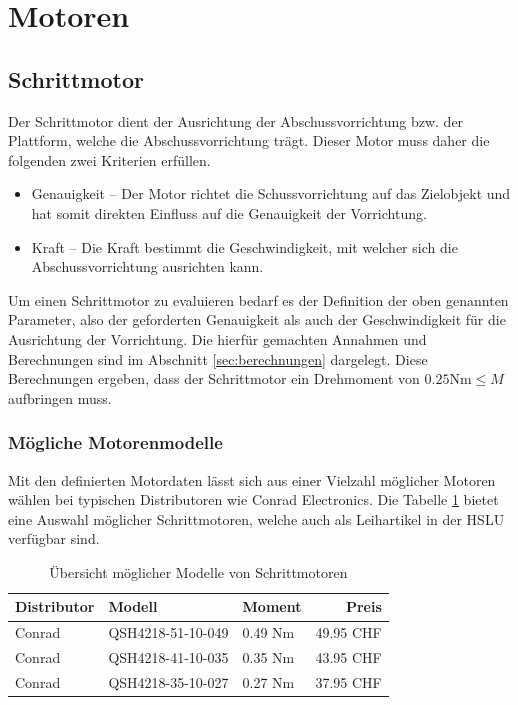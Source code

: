 \section{Motoren} \label{sec:motors}

\subsection{Schrittmotor}
Der Schrittmotor dient der Ausrichtung der Abschussvorrichtung bzw. der
Plattform, welche die Abschussvorrichtung trägt. Dieser Motor muss
daher die folgenden zwei Kriterien erfüllen.

\begin{itemize}
	\item Genauigkeit -- Der Motor richtet die Schussvorrichtung auf
		das Zielobjekt und hat somit direkten Einfluss auf die
		Genauigkeit der Vorrichtung.
	\item Kraft -- Die Kraft bestimmt die Geschwindigkeit, mit welcher
		sich die Abschussvorrichtung ausrichten kann.
\end{itemize}

Um einen Schrittmotor zu evaluieren bedarf es der Definition der oben
genannten Parameter, also der geforderten Genauigkeit als auch der
Geschwindigkeit für die Ausrichtung der Vorrichtung. Die hierfür gemachten
Annahmen und Berechnungen sind im Abschnitt \ref{sec:berechnungen}
dargelegt. Diese Berechnungen ergeben, dass der Schrittmotor ein Drehmoment
von $0.25\text{Nm} \leq M$ aufbringen muss.

\subsubsection{Mögliche Motorenmodelle}
Mit den definierten Motordaten lässt sich aus einer Vielzahl möglicher
Motoren wählen bei typischen Distributoren wie Conrad Electronics. Die
Tabelle \ref{tab:stepper-overview} bietet eine Auswahl möglicher
Schrittmotoren, welche auch als Leihartikel in der HSLU verfügbar sind.

\begin{table}[h!]
	\centering
	\begin{tabular}{l l l r}
		Distributor
			& Modell
			& Moment
			& Preis \\ \hline
		Conrad
			& QSH4218-51-10-049
			& 0.49 Nm
			& 49.95 CHF \\
		Conrad
			& QSH4218-41-10-035
			& 0.35 Nm
			& 43.95 CHF \\
		Conrad
			& QSH4218-35-10-027
			& 0.27 Nm
			& 37.95 CHF
	\end{tabular}
	\caption{Übersicht möglicher Modelle von Schrittmotoren}
	\label{tab:stepper-overview}
\end{table}


